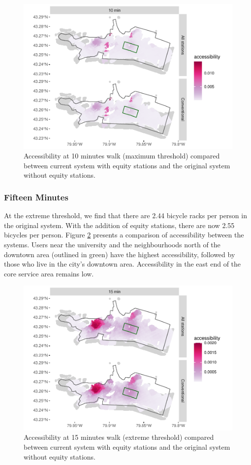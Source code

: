 \documentclass[]{elsarticle} %
\begin{document}
\begin{figure}

{\centering \includegraphics[width=0.65\linewidth]{Bike-share-spatial-equity_files/figure-latex/figure-8-1} 

}

\caption{Accessibility at 10 minutes walk (maximum threshold) compared between current system with equity stations and the original system without equity stations.}\label{fig:figure-8}
\end{figure}

\hypertarget{fifteen-minutes}{%
\subsubsection{Fifteen Minutes}\label{fifteen-minutes}}

At the extreme threshold, we find that there are 2.44 bicycle racks per
person in the original system. With the addition of equity stations,
there are now 2.55 bicycles per person. Figure \ref{fig:figure-9}
presents a comparison of accessibility between the systems. Users near
the university and the neighbourhoods north of the downtown area
(outlined in green) have the highest accessibility, followed by those
who live in the city's downtown area. Accessibility in the east end of
the core service area remains low.

\begin{figure}

{\centering \includegraphics[width=0.65\linewidth]{Bike-share-spatial-equity_files/figure-latex/figure-9-1} 

}

\caption{Accessibility at 15 minutes walk (extreme threshold) compared between current system with equity stations and the original system without equity stations.}\label{fig:figure-9}
\end{figure}
\end{document}
